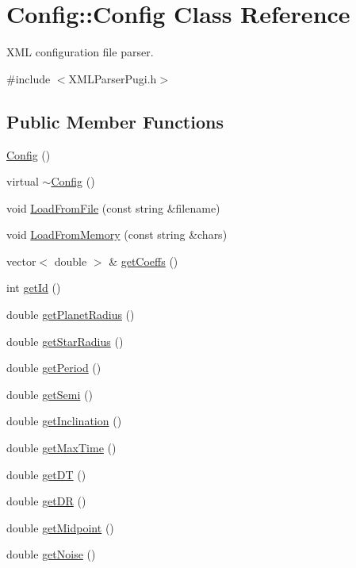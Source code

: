 \hypertarget{classConfig_1_1Config}{
\section{Config::Config Class Reference}
\label{classConfig_1_1Config}
}


XML configuration file parser.  




{\ttfamily \#include $<$XMLParserPugi.h$>$}

\subsection*{Public Member Functions}
\begin{DoxyCompactItemize}
\item 
\hyperlink{classConfig_1_1Config_a2029fc9e053c01997e11e12a37c0fa6d}{Config} ()
\item 
virtual \hyperlink{classConfig_1_1Config_af79503333d9b5121ecce39cb6dd37d0a}{$\sim$Config} ()
\item 
void \hyperlink{classConfig_1_1Config_a265403655a8e7eeb6e1f6ea98a2bc972}{LoadFromFile} (const string \&filename)
\item 
void \hyperlink{classConfig_1_1Config_a63a4269e2f438b77f336abaa2e787228}{LoadFromMemory} (const string \&chars)
\item 
vector$<$ double $>$ \& \hyperlink{classConfig_1_1Config_ab956caec2523388a0a5d94e7d7adcefe}{getCoeffs} ()
\item 
int \hyperlink{classConfig_1_1Config_ababbbc7dc47e8cc17ae55eec2f335994}{getId} ()
\item 
double \hyperlink{classConfig_1_1Config_a33ecdf7de0dfcafbc63a50c0231c074d}{getPlanetRadius} ()
\item 
double \hyperlink{classConfig_1_1Config_a2aafbc9d5be8e6f97070df517ca58552}{getStarRadius} ()
\item 
double \hyperlink{classConfig_1_1Config_a238734845144395728afea0cf4d499a9}{getPeriod} ()
\item 
double \hyperlink{classConfig_1_1Config_a94d5624d0d2f127ec00d560ccac121f8}{getSemi} ()
\item 
double \hyperlink{classConfig_1_1Config_a15d450e32246e7bb5439c0cfe68dedfd}{getInclination} ()
\item 
double \hyperlink{classConfig_1_1Config_a91cbcd53b8bbb260603f36959b419bee}{getMaxTime} ()
\item 
double \hyperlink{classConfig_1_1Config_a07c405b7013694fea51eb7d902ad4abb}{getDT} ()
\item 
double \hyperlink{classConfig_1_1Config_a93247745f2020ef250453fd9b61b4cb4}{getDR} ()
\item 
double \hyperlink{classConfig_1_1Config_add5d144f8f59e3737f0c88f4deb2669e}{getMidpoint} ()
\item 
double \hyperlink{classConfig_1_1Config_a6d86b540ec8b4264fa3d3e00065ce2a5}{getNoise} ()
\end{DoxyCompactItemize}
